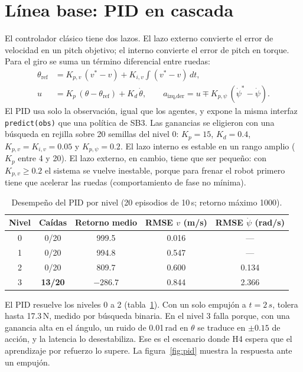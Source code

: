 \documentclass[11pt,a4paper]{article}
\newcommand{\code}[1]{\texttt{#1}}
\newcommand{\SI}[2]{#1\,#2}  %
\begin{document}
\section{Línea base: PID en cascada}

El controlador clásico tiene dos lazos. El lazo externo convierte el error de velocidad en un pitch objetivo; el interno convierte el error de pitch en torque. Para el giro se suma un término diferencial entre ruedas:
\begin{align}
\theta_\text{ref} &= K_{p,v}\,(v^*-v) + K_{i,v}\!\int (v^*-v)\,dt, \\
u &= K_p\,(\theta-\theta_\text{ref}) + K_d\,\dot\theta, \qquad
a_{\text{izq},\text{der}} = u \mp K_{p,\psi}\,(\dot\psi^*-\dot\psi).
\end{align}
El PID usa solo la observación, igual que los agentes, y expone la misma interfaz \code{predict(obs)} que una política de SB3. Las ganancias se eligieron con una búsqueda en rejilla sobre 20 semillas del nivel 0: $K_p=15$, $K_d=0.4$, $K_{p,v}=K_{i,v}=0.05$ y $K_{p,\psi}=0.2$. El lazo interno es estable en un rango amplio ($K_p$ entre 4 y 20). El lazo externo, en cambio, tiene que ser pequeño: con $K_{p,v}\ge 0.2$ el sistema se vuelve inestable, porque para frenar el robot primero tiene que acelerar las ruedas (comportamiento de fase no mínima).

\begin{table}[H]
\centering
\caption{Desempeño del PID por nivel (20 episodios de \SI{10}{s}; retorno máximo 1000).}
\label{tab:pid}
\begin{tabular}{@{}ccccc@{}}
\toprule
Nivel & Caídas & Retorno medio & RMSE $v$ (m/s) & RMSE $\dot\psi$ (rad/s) \\
\midrule
0 & 0/20 & 999.5 & 0.016 & --- \\
1 & 0/20 & 994.8 & 0.547 & --- \\
2 & 0/20 & 809.7 & 0.600 & 0.134 \\
3 & \textbf{13/20} & $-286.7$ & 0.844 & 2.366 \\
\bottomrule
\end{tabular}
\end{table}

El PID resuelve los niveles 0 a 2 (tabla~\ref{tab:pid}). Con un solo empujón a $t=\SI{2}{s}$, tolera hasta \SI{17.3}{N}, medido por búsqueda binaria. En el nivel 3 falla porque, con una ganancia alta en el ángulo, un ruido de \SI{0.01}{rad} en $\theta$ se traduce en $\pm0.15$ de acción, y la latencia lo desestabiliza. Ese es el escenario donde H4 espera que el aprendizaje por refuerzo lo supere. La figura~\ref{fig:pid} muestra la respuesta ante un empujón.
\end{document}
